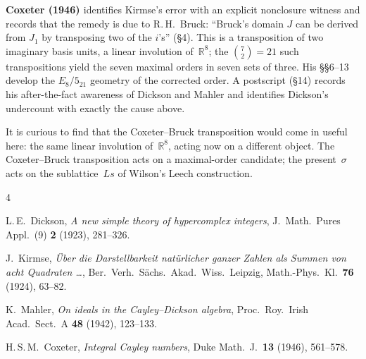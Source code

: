 \documentclass[11pt]{amsart}
\newcommand{\RR}{\mathbb{R}}
\begin{document}
\noindent\textbf{Coxeter (1946) \cite{Coxeter1946}} identifies Kirmse's
error with an explicit nonclosure witness and records that the remedy is
due to R.\,H.~Bruck: ``Bruck's domain $J$ can be derived from $J_1$ by
transposing two of the $i$'s'' (\S4).  This is a transposition of two
imaginary basis units, a linear involution of~$\RR^8$; the
$\binom72 = 21$ such transpositions yield the seven maximal orders in
seven sets of three.  His \S\S6--13 develop the $E_8/5_{21}$ geometry of
the corrected order.  A postscript (\S14) records his after-the-fact
awareness of Dickson and Mahler and identifies Dickson's undercount with
exactly the cause above.

It is curious to find that the Coxeter--Bruck transposition would
come in useful here: the same linear involution of~$\RR^8$, acting
now on a different object.  The Coxeter--Bruck transposition acts on
a maximal-order candidate; the present~$\sigma$ acts on the
sublattice~$Ls$ of Wilson's Leech construction.

\begin{thebibliography}{4}

L.\,E.~Dickson, \emph{A new simple theory of hypercomplex integers},
J.~Math.\ Pures Appl.\ (9) \textbf{2} (1923), 281--326.

J.~Kirmse, \emph{\"Uber die Darstellbarkeit nat\"urlicher ganzer Zahlen
als Summen von acht Quadraten \ldots}, Ber.\ Verh.\ S\"achs.\ Akad.\
Wiss.\ Leipzig, Math.-Phys.\ Kl.\ \textbf{76} (1924), 63--82.

K.~Mahler, \emph{On ideals in the Cayley--Dickson algebra},
Proc.\ Roy.\ Irish Acad.\ Sect.\ A \textbf{48} (1942), 123--133.

H.\,S.\,M.~Coxeter, \emph{Integral Cayley numbers},
Duke Math.\ J.\ \textbf{13} (1946), 561--578.

\end{thebibliography}
\end{document}
